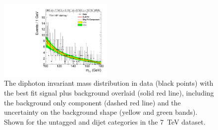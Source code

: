 \begin{figure}
  \includegraphics[width=0.49\textwidth]{results/plots/mgg-cats/mgg_mva_nosub_ch1_cat5_7TeV.pdf}
  \caption[The diphoton invariant mass distribution in data with the best fit signal plus background overlaid for the untagged and dijet tagged categories in the 8~TeV dataset.]{The diphoton invariant mass distribution in data (black points) with the best fit signal plus background overlaid (solid red line), including the background only component (dashed red line) and the uncertainty on the background shape (yellow and green bands). Shown for the untagged and dijet categories in the 7~TeV dataset.}
  \label{fig:bfres1}
\end{figure}

